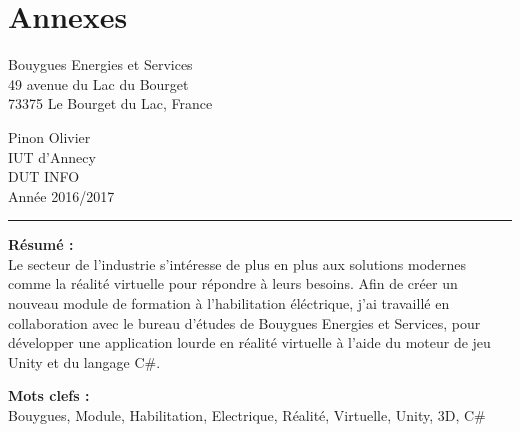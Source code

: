 \documentclass[a4paper]{article}
\begin{document}
    \section{Annexes}
    
    \newpage 
    \normalsize
    \thispagestyle{empty}
    \noindent
    \begin{minipage}{.5\textwidth}
        Bouygues Energies et Services \\
        49 avenue du Lac du Bourget \\
        73375 Le Bourget du Lac, France
    \end{minipage}
    \begin{minipage}{.5\textwidth}
    \begin{flushright}
        Pinon Olivier \\
        IUT d'Annecy \\
        DUT INFO \\
        Année 2016/2017 \\
    \end{flushright}
    \end{minipage}

    \vspace{10pt}
    \noindent\rule{0.725\paperwidth}{0.4pt}
    
    \vfill 
    \begin{flushleft}
    \huge \textbf{Résumé : } \\
    \vspace{10pt}
    \normalsize Le secteur de l'industrie s'intéresse de plus en plus aux solutions modernes comme la réalité virtuelle pour répondre à leurs besoins. Afin de créer un nouveau module de formation à l'habilitation éléctrique, j'ai travaillé en collaboration avec le bureau d'études de Bouygues Energies et Services, pour développer une application lourde en réalité virtuelle à l'aide du moteur de jeu Unity et du langage C\#. \\
    \end{flushleft}
    
    \vfill 
    \begin{flushleft}
    \huge \textbf{Mots clefs : } \vspace{2pt} \\
    \vspace{10pt}
    \normalsize Bouygues, Module, Habilitation, Electrique, Réalité, Virtuelle, Unity, 3D, C\#
    \end{flushleft}
\end{document}
